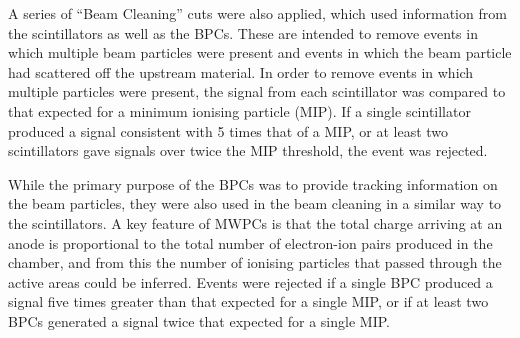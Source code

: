 A series of ``Beam Cleaning'' cuts were also applied, which used information from the scintillators as well as the BPCs. These are intended to remove events in which  multiple beam particles were present and events in which the beam particle had scattered off the upstream material. In order to remove events in which multiple particles were present, the signal from each scintillator was compared to that expected for a minimum ionising particle (MIP). If a single scintillator produced a signal consistent with 5 times that of a MIP, or at least two scintillators gave signals over twice the MIP threshold, the event was rejected. 

While the primary purpose of the BPCs was to provide tracking information on the beam particles, they were also used in the beam cleaning in a similar way to the scintillators. A key feature of MWPCs is that the total charge arriving at an anode is proportional to the total number of electron-ion pairs produced in the chamber, and from this the number of ionising particles that passed through the active areas could be inferred. Events were rejected if a single BPC produced a signal five times greater than that expected for a single MIP, or if at least two BPCs generated a signal twice that expected for a single MIP.






